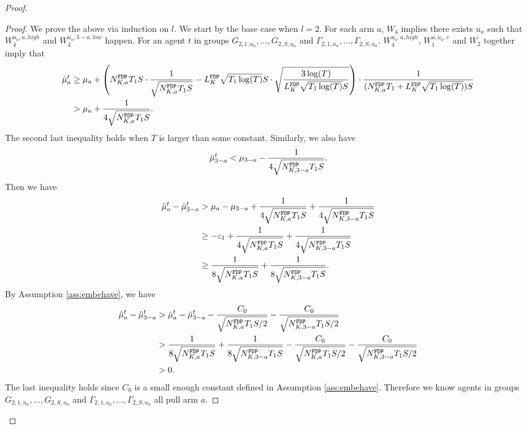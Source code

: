 \begin{proof}
\begin{proof}
We prove the above via induction on $l$. %
We start by the base case when $l=2$. For each arm $a$, $W_4$ implies there exists $u_a$ such that $W^{u_a,a,high}_4$ and $W^{u_a,3-a,low}_4$ happen. For an agent $t$  in groups $G_{2,1,u_a},...,G_{2,S,u_a}$ and $\Gamma_{2,1,u_a},...,\Gamma_{2,S,u_a}$.
$W_4^{u_a,a,high}$,  $W_1^{a,u_a,v}$ and $W_2$ together imply that 
\begin{align*}
\bar{\mu}_a ^t &\geq \mu_a + \left(\fdpN T_1S \cdot \frac{1}{\sqrt{\fdpN T_1S}} - \GdT \sqrt{T_1\log(T)} S\cdot \sqrt{\frac{3\log(T)}{ \GdT \sqrt{T_1\log(T)}S}} \right) \cdot \frac{1}{(\fdpN T_1+ \GdT \sqrt{T_1\log(T)})S} \\
&> \mu_a + \frac{1}{4\sqrt{\fdpN T_1S}}.
\end{align*}
The second last inequality holds when $T$ is larger than some constant.
Similarly, we also have
\[
\bar{\mu}_{3-a}^t< \mu_{3-a}   - \frac{1}{4\sqrt{\fdpN[3-a] T_1S}}.
\]
Then we have
\begin{align*}
\bar{\mu}^t_a - \bar{\mu}^t_{3-a} &> \mu_a - \mu_{3-a} + \frac{1}{4\sqrt{\fdpN T_1S}} + \frac{1}{4\sqrt{\fdpN[3-a] T_1S}}\\
&\geq -\varepsilon_1+ \frac{1}{4\sqrt{\fdpN T_1S}} + \frac{1}{4\sqrt{\fdpN[3-a] T_1S}}\\
&\geq \frac{1}{8\sqrt{\fdpN T_1S}} + \frac{1}{8\sqrt{\fdpN[3-a] T_1S}}.
\end{align*}
By Assumption \ref{ass:embehave}, we have
\begin{align*}
\hat{\mu}_a^t - \hat{\mu}_{3-a}^t &> \bar{\mu}^t_a - \bar{\mu}^t_{3-a} -  \frac{C_0}{\sqrt{\fdpN T_1S/2}} - \frac{C_0}{\sqrt{\fdpN[3-a] T_1S/2}}\\
&> \frac{1}{8\sqrt{\fdpN T_1S}} + \frac{1}{8\sqrt{\fdpN[3-a] T_1S}} -   \frac{C_0}{\sqrt{\fdpN T_1S/2}} - \frac{C_0}{\sqrt{\fdpN[3-a] T_1S/2}}\\
&>0.
\end{align*}
The last inequality holds since $C_0$ is a small enough constant defined in Assumption \ref{ass:embehave}. Therefore we know agents in groups $G_{2,1,u_a},...,G_{2,S,u_a}$ and $\Gamma_{2,1,u_a},...,\Gamma_{2,S,u_a}$ all pull arm $a$.


\end{proof}
\end{proof}
